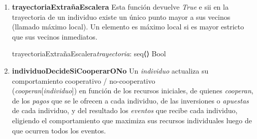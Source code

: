 \documentclass[10pt,a4paper]{article}
\begin{document}
\begin{enumerate}

    \clearpage 

    \item \textbf{trayectoriaExtrañaEscalera} Esta función devuelve \textit{True} e sii en la trayectoria de un individuo existe un único punto mayor a sus vecinos (llamado máximo local). Un elemento es máximo local si es mayor estricto que sus vecinos inmediatos.
    
    \begin{proc}{trayectoriaExtrañaEscalera}{\In \textit{trayectoria}: seq⟨\real⟩} {Bool}


    \end{proc}

    \item \textbf{individuoDecideSiCooperarONo} Un \textit{individuo} actualiza su comportamiento cooperativo / no-cooperativo \\(\textit{cooperan}[\textit{individuo}]) en función de los recursos iniciales, de quienes \textit{cooperan}, de los \textit{pagos} que se le ofrecen a cada individuo, de las inversiones o \textit{apuestas} de cada individuo, y del resultado los \textit{eventos} que recibe cada individuo, eligiendo el comportamiento que maximiza sus recursos individuales luego de que ocurren todos los eventos.


\end{enumerate}
\end{document}
